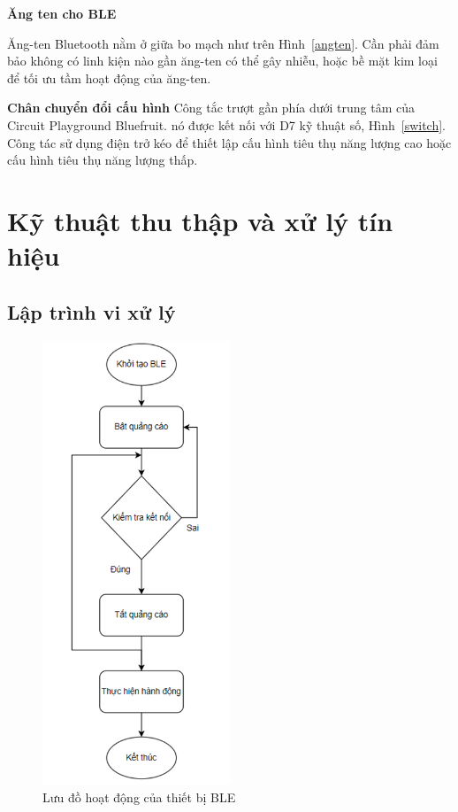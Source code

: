 \textbf{Ăng ten cho BLE}

Ăng-ten Bluetooth nằm ở giữa bo mạch như trên Hình~\ref{angten}. Cần phải đảm bảo không có linh kiện nào gần ăng-ten có thể gây nhiễu, hoặc bề mặt kim loại để tối ưu tầm hoạt động của ăng-ten.




\textbf{Chân chuyển đổi cấu hình}
Công tắc trượt gần phía dưới trung tâm của Circuit Playground Bluefruit. nó được kết nối với D7 kỹ thuật số, Hình~\ref{switch}. Công tác sử dụng điện trở kéo để thiết lập cấu hình tiêu thụ năng lượng cao hoặc cấu hình tiêu thụ năng lượng thấp. 







\section{Kỹ thuật thu thập và xử lý tín hiệu}
\subsection{Lập trình vi xử lý}

\begin{figure}[!]
		\centering
 		\includegraphics[width=0.5\textwidth]{images/flowBLE.png}
		\caption{Lưu đồ hoạt động của thiết bị BLE}
		\label{flowBLE}
\end{figure}

